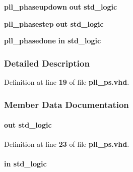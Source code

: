 \begin{DoxyCompactItemize}
\item 
{\bf pll\+\_\+phaseupdown}  {\bfseries {\bfseries \textcolor{keywordflow}{out}\textcolor{vhdlchar}{ }}} {\bfseries \textcolor{comment}{std\+\_\+logic}\textcolor{vhdlchar}{ }} 
\item 
{\bf pll\+\_\+phasestep}  {\bfseries {\bfseries \textcolor{keywordflow}{out}\textcolor{vhdlchar}{ }}} {\bfseries \textcolor{comment}{std\+\_\+logic}\textcolor{vhdlchar}{ }} 
\item 
{\bf pll\+\_\+phasedone}  {\bfseries {\bfseries \textcolor{keywordflow}{in}\textcolor{vhdlchar}{ }}} {\bfseries \textcolor{comment}{std\+\_\+logic}\textcolor{vhdlchar}{ }} 
\end{DoxyCompactItemize}


\subsubsection{Detailed Description}


Definition at line {\bf 19} of file {\bf pll\+\_\+ps.\+vhd}.



\subsubsection{Member Data Documentation}
\paragraph[{busy}]{ {\bfseries \textcolor{keywordflow}{out}\textcolor{vhdlchar}{ }} {\bfseries \textcolor{comment}{std\+\_\+logic}\textcolor{vhdlchar}{ }} \hspace{0.3cm}{\ttfamily [Port]}}\label{classpll__ps_aae338b3a18acd4650d65866291f3aece}


Definition at line {\bf 23} of file {\bf pll\+\_\+ps.\+vhd}.

\paragraph[{clk}]{ {\bfseries \textcolor{keywordflow}{in}\textcolor{vhdlchar}{ }} {\bfseries \textcolor{comment}{std\+\_\+logic}\textcolor{vhdlchar}{ }} \hspace{0.3cm}{\ttfamily [Port]}}\label{classpll__ps_a4a4609c199d30b3adebbeb3a01276ec5}


